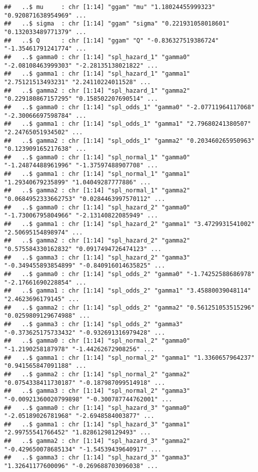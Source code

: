\documentclass[
]{article}
\begin{document}
\begin{verbatim}
##   ..$ mu     : chr [1:14] "ggam" "mu" "1.18024455999323" "0.920871638954969" ...
##   ..$ sigma  : chr [1:14] "ggam" "sigma" "0.221931058018601" "0.132033489771379" ...
##   ..$ Q      : chr [1:14] "ggam" "Q" "-0.836327519386724" "-1.35461791241774" ...
##   ..$ gamma0 : chr [1:14] "spl_hazard_1" "gamma0" "-2.08108463999303" "-2.28135138021822" ...
##   ..$ gamma1 : chr [1:14] "spl_hazard_1" "gamma1" "2.75121513493231" "2.24110224011528" ...
##   ..$ gamma2 : chr [1:14] "spl_hazard_1" "gamma2" "0.229180867157295" "0.158502207690514" ...
##   ..$ gamma0 : chr [1:14] "spl_odds_1" "gamma0" "-2.07711964117068" "-2.30066697598784" ...
##   ..$ gamma1 : chr [1:14] "spl_odds_1" "gamma1" "2.79680241380507" "2.24765051934502" ...
##   ..$ gamma2 : chr [1:14] "spl_odds_1" "gamma2" "0.203460265950963" "0.123909165217638" ...
##   ..$ gamma0 : chr [1:14] "spl_normal_1" "gamma0" "-1.24874488961996" "-1.37597488907708" ...
##   ..$ gamma1 : chr [1:14] "spl_normal_1" "gamma1" "1.29340679235899" "1.04049287777886" ...
##   ..$ gamma2 : chr [1:14] "spl_normal_1" "gamma2" "0.0684952333662753" "0.0284463997570112" ...
##   ..$ gamma0 : chr [1:14] "spl_hazard_2" "gamma0" "-1.73006795804966" "-2.13140822085949" ...
##   ..$ gamma1 : chr [1:14] "spl_hazard_2" "gamma1" "3.4729931541002" "2.50695154898974" ...
##   ..$ gamma2 : chr [1:14] "spl_hazard_2" "gamma2" "0.575584330162832" "0.0917494726474123" ...
##   ..$ gamma3 : chr [1:14] "spl_hazard_2" "gamma3" "-0.349455893854899" "-0.840916014635825" ...
##   ..$ gamma0 : chr [1:14] "spl_odds_2" "gamma0" "-1.74252588686978" "-2.17661690228854" ...
##   ..$ gamma1 : chr [1:14] "spl_odds_2" "gamma1" "3.45880039048114" "2.4623696179145" ...
##   ..$ gamma2 : chr [1:14] "spl_odds_2" "gamma2" "0.561251053515296" "0.0259809129674988" ...
##   ..$ gamma3 : chr [1:14] "spl_odds_2" "gamma3" "-0.373625175733432" "-0.932691316979428" ...
##   ..$ gamma0 : chr [1:14] "spl_normal_2" "gamma0" "-1.2190258187978" "-1.44262672908256" ...
##   ..$ gamma1 : chr [1:14] "spl_normal_2" "gamma1" "1.3360657964237" "0.941565847091188" ...
##   ..$ gamma2 : chr [1:14] "spl_normal_2" "gamma2" "0.0754338411730187" "-0.187987099514918" ...
##   ..$ gamma3 : chr [1:14] "spl_normal_2" "gamma3" "-0.00921360020799898" "-0.300787744762001" ...
##   ..$ gamma0 : chr [1:14] "spl_hazard_3" "gamma0" "-2.05189026781968" "-2.6948584003877" ...
##   ..$ gamma1 : chr [1:14] "spl_hazard_3" "gamma1" "2.99755541766452" "1.82861298129493" ...
##   ..$ gamma2 : chr [1:14] "spl_hazard_3" "gamma2" "-0.429650078685134" "-1.54539439640917" ...
##   ..$ gamma3 : chr [1:14] "spl_hazard_3" "gamma3" "1.32641177600096" "-0.269688703096038" ...

\end{verbatim}
\end{document}
